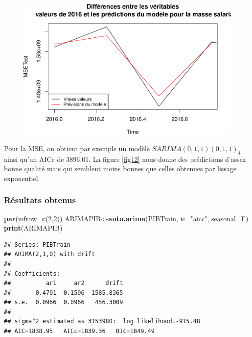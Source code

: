 \documentclass[11pt,]{article}
\newenvironment{Shaded}{\begin{snugshade}}{\end{snugshade}}
\newcommand{\KeywordTok}[1]{\textcolor[rgb]{0.13,0.29,0.53}{\textbf{#1}}}
\newcommand{\DataTypeTok}[1]{\textcolor[rgb]{0.13,0.29,0.53}{#1}}
\newcommand{\DecValTok}[1]{\textcolor[rgb]{0.00,0.00,0.81}{#1}}
\newcommand{\StringTok}[1]{\textcolor[rgb]{0.31,0.60,0.02}{#1}}
\newcommand{\NormalTok}[1]{#1}
\begin{document}
\begin{figure}

{\centering \includegraphics{doc_files/figure-latex/unnamed-chunk-14-1} 

}

\caption{\label{fig12}}\label{fig:unnamed-chunk-14}
\end{figure}

Pour la MSE, on obtient par exemple un modèle \(SARIMA(0,1,1)(0,1,1)_4\)
ainsi qu'un AICc de 3896.01. La figure \ref{fig12} nous donne des
prédictions d'assez bonne qualité mais qui semblent moins bonnes que
celles obtenues par lissage exponentiel.

\subsubsection{Résultats obtenus}\label{resultats-obtenus-1}

\begin{Shaded}
\begin{Highlighting}[]
\KeywordTok{par}\NormalTok{(}\DataTypeTok{mfrow=}\KeywordTok{c}\NormalTok{(}\DecValTok{2}\NormalTok{,}\DecValTok{2}\NormalTok{))}
\NormalTok{ARIMAPIB<-}\KeywordTok{auto.arima}\NormalTok{(PIBTrain, }\DataTypeTok{ic=}\StringTok{"aicc"}\NormalTok{, }\DataTypeTok{seasonal=}\NormalTok{F)}
\KeywordTok{print}\NormalTok{(ARIMAPIB)}
\end{Highlighting}
\end{Shaded}

\begin{verbatim}
## Series: PIBTrain 
## ARIMA(2,1,0) with drift 
## 
## Coefficients:
##          ar1     ar2      drift
##       0.4701  0.1596  1585.8365
## s.e.  0.0966  0.0966   456.3009
## 
## sigma^2 estimated as 3153980:  log likelihood=-915.48
## AIC=1838.95   AICc=1839.36   BIC=1849.49
\end{verbatim}
\end{document}

